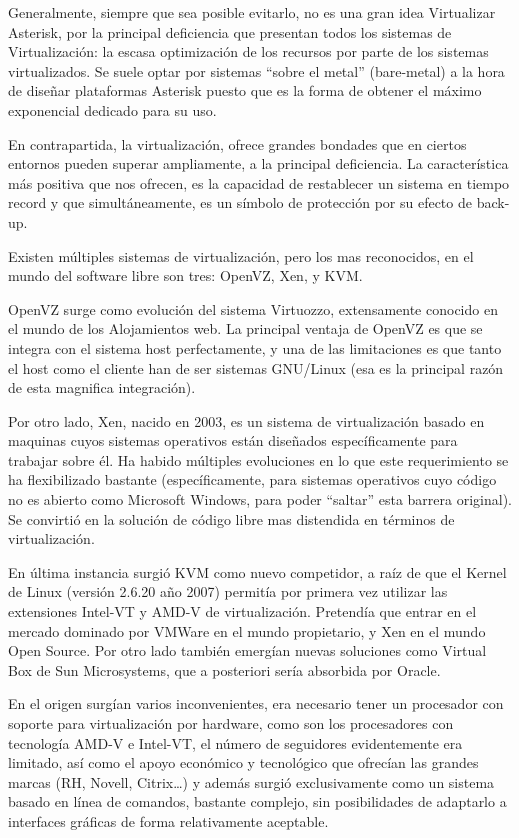 Generalmente, siempre que sea posible evitarlo, no es una gran idea Virtualizar Asterisk, por la principal deficiencia que presentan todos los sistemas de Virtualización: la escasa optimización de los recursos por parte de los sistemas virtualizados. Se suele optar por sistemas “sobre el metal” (bare-metal) a la hora de diseñar plataformas Asterisk puesto que es la forma de obtener el máximo exponencial dedicado para su uso.

En contrapartida, la virtualización, ofrece grandes bondades que en ciertos entornos pueden superar ampliamente, a la principal deficiencia. La característica más positiva que nos ofrecen, es la capacidad de restablecer un sistema en tiempo record y que simultáneamente, es un símbolo de protección por su efecto de back-up.

Existen múltiples sistemas de virtualización, pero los mas reconocidos, en el mundo del software libre son tres: OpenVZ, Xen, y KVM. 

OpenVZ surge como evolución del sistema Virtuozzo, extensamente conocido en el mundo de los Alojamientos web. La principal ventaja de OpenVZ es que se integra con el sistema host perfectamente, y una de las limitaciones es que tanto el host como el cliente han de ser sistemas GNU/Linux (esa es la principal razón de esta magnifica integración). 

Por otro lado, Xen, nacido en 2003, es un sistema de virtualización basado en maquinas cuyos sistemas operativos están diseñados específicamente para trabajar sobre él. Ha habido múltiples evoluciones en lo que este requerimiento se ha flexibilizado bastante (específicamente, para sistemas operativos cuyo código no es abierto como Microsoft Windows, para poder “saltar” esta barrera original). Se convirtió en la solución de código libre mas distendida en términos de virtualización.

En última instancia surgió KVM como nuevo competidor, a raíz de que el Kernel de Linux (versión 2.6.20 año 2007) permitía por primera vez utilizar las extensiones Intel-VT y AMD-V de virtualización. Pretendía que entrar en el mercado dominado por VMWare en el mundo propietario, y Xen en el mundo Open Source. Por otro lado también emergían nuevas soluciones como Virtual Box de Sun Microsystems, que a posteriori sería absorbida por Oracle.

En el origen surgían varios inconvenientes, era necesario tener un procesador con soporte para virtualización por hardware, como son los procesadores con tecnología AMD-V e Intel-VT, el número de seguidores evidentemente era limitado, así como el apoyo económico y tecnológico que ofrecían las grandes marcas (RH, Novell, Citrix…) y además surgió exclusivamente como un sistema basado en línea de comandos, bastante complejo, sin posibilidades de adaptarlo a interfaces gráficas de forma relativamente aceptable.

